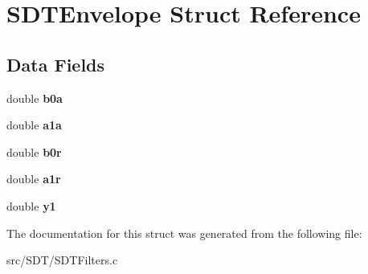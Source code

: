 \hypertarget{struct_s_d_t_envelope}{}\section{S\+D\+T\+Envelope Struct Reference}
\label{struct_s_d_t_envelope}
\subsection*{Data Fields}
\begin{DoxyCompactItemize}
\item 
\hypertarget{struct_s_d_t_envelope_a449652a77ce5e98de68ea1d0c37ade36}{}double {\bfseries b0a}\label{struct_s_d_t_envelope_a449652a77ce5e98de68ea1d0c37ade36}

\item 
\hypertarget{struct_s_d_t_envelope_a2bc8652642eeaea103e18dee03b13b63}{}double {\bfseries a1a}\label{struct_s_d_t_envelope_a2bc8652642eeaea103e18dee03b13b63}

\item 
\hypertarget{struct_s_d_t_envelope_a34c18d71cca2a4dde3e4d634eeaaccbe}{}double {\bfseries b0r}\label{struct_s_d_t_envelope_a34c18d71cca2a4dde3e4d634eeaaccbe}

\item 
\hypertarget{struct_s_d_t_envelope_af804e6b83ee4f51020eeada84e762492}{}double {\bfseries a1r}\label{struct_s_d_t_envelope_af804e6b83ee4f51020eeada84e762492}

\item 
\hypertarget{struct_s_d_t_envelope_ac3b72e5b77595ca2340ecf8ccfe5fd99}{}double {\bfseries y1}\label{struct_s_d_t_envelope_ac3b72e5b77595ca2340ecf8ccfe5fd99}

\end{DoxyCompactItemize}


The documentation for this struct was generated from the following file\+:\begin{DoxyCompactItemize}
\item 
src/\+S\+D\+T/S\+D\+T\+Filters.\+c\end{DoxyCompactItemize}
